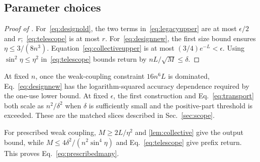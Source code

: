 \subsection{Parameter choices}
\begin{proof}[Proof of ]
For~\eqref{eq:designold}, the two terms in~\eqref{eq:legacyupper} are at most $\epsilon/2$ and $r$;~\eqref{eq:telescope} is at most $r$. For~\eqref{eq:designnew}, the first size bound ensures $\eta\le3/(8n^3)$. Equation~\eqref{eq:collectiveupper} is at most $(3/4)e^{-L}<\epsilon$. Using $\sin^2\eta\le\eta^2$ in~\eqref{eq:telescope} bounds return by $nL/\sqrt M\le\delta$.
\end{proof}

At fixed $n$, once the weak-coupling constraint $16n^6L$ is dominated, Eq.~\eqref{eq:designnew} has the logarithm-squared accuracy dependence required by the one-use lower bound. At fixed $\epsilon$, the first construction and Eq.~\eqref{eq:transport} both scale as $n^2/\delta^2$ when $\delta$ is sufficiently small and the positive-part threshold is exceeded. These are the matched slices described in Sec.~\ref{sec:scope}.

For prescribed weak coupling, $M\ge2L/\eta^2$ and \cref{lem:collective} give the output bound, while $M\le4\delta^2/(n^2\sin^4\eta)$ and Eq.~\eqref{eq:telescope} give prefix return. This proves Eq.~\eqref{eq:prescribedmany}.
